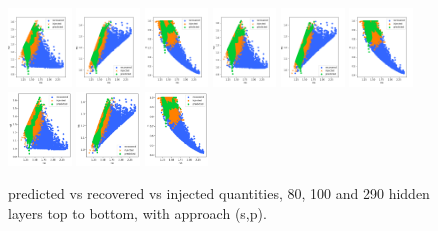 \documentclass[prd,aps,twocolumn,a4paper,showkeys,nofootinbib]{revtex4-1}
\begin{document}
\begin{figure}[]
  \center
  \includegraphics[width=0.15\textwidth]{./Figs/80_masses}
  \includegraphics[width=0.15\textwidth]{./Figs/80_Mc}
  \includegraphics[width=0.15\textwidth]{./Figs/80_q}
  \includegraphics[width=0.15\textwidth]{./Figs/100_masses}
  \includegraphics[width=0.15\textwidth]{./Figs/100_Mc}
  \includegraphics[width=0.15\textwidth]{./Figs/100_q}
  \includegraphics[width=0.15\textwidth]{./Figs/290_m1m2all}
  \includegraphics[width=0.15\textwidth]{./Figs/290_m1Mcall}
  \includegraphics[width=0.15\textwidth]{./Figs/290_q}
  \caption{\label{fig:approach3_comparison3} predicted vs recovered vs injected quantities, 80, 100 and 290 hidden layers top to bottom, with approach (s,p).}
\end{figure}
\end{document}
